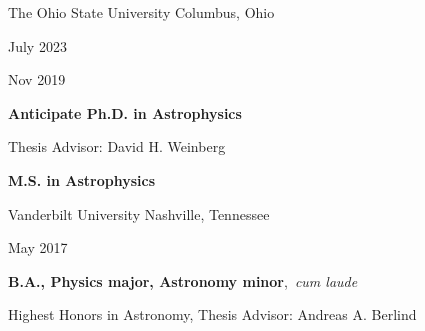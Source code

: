 \documentclass[cv.tex]{subfiles}
\begin{document}
{\color{themecolor}\large The Ohio State University}
\hfill
Columbus, Ohio
\par\noindent
\parbox{0.18\textwidth}{%
	\raggedleft
	July 2023 \par
	\null \par
	Nov 2019
}
\hspace{1mm}
\parbox{0.8\textwidth}{%
	\textbf{Anticipate Ph.D. in Astrophysics} \par
	Thesis Advisor: David H. Weinberg \par
	\textbf{M.S. in Astrophysics}
}
\vspace{2mm}
\par\noindent
{\color{themecolor}\large Vanderbilt University}
\hfill
Nashville, Tennessee
\par\noindent
\parbox{0.18\textwidth}{%
	\raggedleft
	May 2017 \par
	\null
}
\hspace{1mm}
\parbox{0.8\textwidth}{%
	\vspace{1mm}
	\textbf{B.A., Physics major, Astronomy minor},~\textit{cum laude} \par
	Highest Honors in Astronomy, Thesis Advisor: Andreas A. Berlind
}
\end{document}
